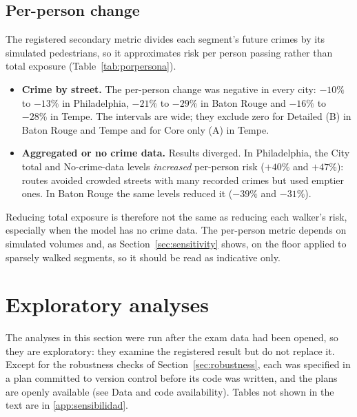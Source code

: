 \documentclass[preprint,12pt,authoryear]{elsarticle}
\newcommand{\ajustar}[1]{\adjustbox{max width=\textwidth}{#1}}
\begin{document}
\subsection{Per-person change}
The registered secondary metric divides each segment's future crimes by its simulated pedestrians, so it approximates risk per person passing rather than total exposure (Table~\ref{tab:porpersona}).
\begin{itemize}
  \item \textbf{Crime by street.} The per-person change was negative in every city: $-10\%$ to $-13\%$ in Philadelphia, $-21\%$ to $-29\%$ in Baton Rouge and $-16\%$ to $-28\%$ in Tempe. The intervals are wide; they exclude zero for Detailed (B) in Baton Rouge and Tempe and for Core only (A) in Tempe.
  \item \textbf{Aggregated or no crime data.} Results diverged. In Philadelphia, the City total and No-crime-data levels \emph{increased} per-person risk ($+40\%$ and $+47\%$): routes avoided crowded streets with many recorded crimes but used emptier ones. In Baton Rouge the same levels reduced it ($-39\%$ and $-31\%$).
\end{itemize}
Reducing total exposure is therefore not the same as reducing each walker's risk, especially when the model has no crime data. The per-person metric depends on simulated volumes and, as Section~\ref{sec:sensitivity} shows, on the floor applied to sparsely walked segments, so it should be read as indicative only.

\begin{table}[htbp]
\centering\small
\caption{Per-person change (registered secondary metric): change in future core incidents per simulated pedestrian on lowest-risk vs.\ fastest routes, \% (95\% CI), over trips with a lowest-risk route. Each segment's incidents are divided by its simulated pedestrians in that time band, with a floor at the median of segments with pedestrians.}
\label{tab:porpersona}
\ajustar{}
\end{table}

\section{Exploratory analyses}\label{sec:exploratory}
The analyses in this section were run after the exam data had been opened, so they are exploratory: they examine the registered result but do not replace it. Except for the robustness checks of Section~\ref{sec:robustness}, each was specified in a plan committed to version control before its code was written, and the plans are openly available (see Data and code availability). Tables not shown in the text are in \ref{app:sensibilidad}.
\end{document}
